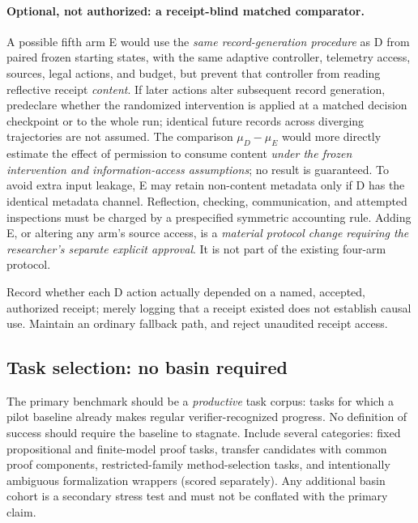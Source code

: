 \documentclass[11pt,letterpaper]{article}
\begin{document}
\paragraph{Optional, not authorized: a receipt-blind matched comparator.} A possible fifth arm E would use the \emph{same record-generation procedure} as D from paired frozen starting states, with the same adaptive controller, telemetry access, sources, legal actions, and budget, but prevent that controller from reading reflective receipt \emph{content}. If later actions alter subsequent record generation, predeclare whether the randomized intervention is applied at a matched decision checkpoint or to the whole run; identical future records across diverging trajectories are not assumed. The comparison $\mu_D-\mu_E$ would more directly estimate the effect of permission to consume content \emph{under the frozen intervention and information-access assumptions}; no result is guaranteed. To avoid extra input leakage, E may retain non-content metadata only if D has the identical metadata channel. Reflection, checking, communication, and attempted inspections must be charged by a prespecified symmetric accounting rule. Adding E, or altering any arm's source access, is a \emph{material protocol change requiring the researcher's separate explicit approval}. It is not part of the existing four-arm protocol.

Record whether each D action actually depended on a named, accepted, authorized receipt; merely logging that a receipt existed does not establish causal use. Maintain an ordinary fallback path, and reject unaudited receipt access.

\subsection{Task selection: no basin required}
The primary benchmark should be a \emph{productive} task corpus: tasks for which a pilot baseline already makes regular verifier-recognized progress. No definition of success should require the baseline to stagnate. Include several categories: fixed propositional and finite-model proof tasks, transfer candidates with common proof components, restricted-family method-selection tasks, and intentionally ambiguous formalization wrappers (scored separately). Any additional basin cohort is a secondary stress test and must not be conflated with the primary claim.
\end{document}
